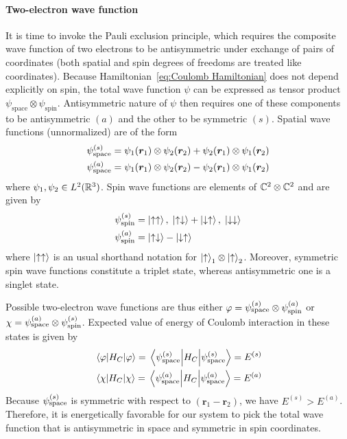 \paragraph{Two-electron wave function}It is time to invoke the Pauli exclusion principle, which requires the composite wave function
of two electrons to be antisymmetric under exchange of pairs of coordinates (both spatial and
spin degrees of freedoms are treated like coordinates). Because 
Hamiltonian~\ref{eq:Coulomb Hamiltonian} does not depend explicitly on spin, the total
wave function \(\psi\) can be expressed as tensor product \(\psi_{\mathrm{space}} 
\otimes \psi_{\mathrm{spin}} \). Antisymmetric nature of \(\psi\) then requires one 
of these components to be antisymmetric \((a)\) and the other to be symmetric \((s)\). 
Spatial wave functions (unnormalized) are of the form
\begin{align}
    &\psi_{\textrm{space}}^{(s)} = \psi_1(\bm{r}_1)\otimes \psi_2(\bm{r}_2) +
    \psi_2(\bm{r}_1)\otimes \psi_1(\bm{r}_2) \\
    &\psi_{\textrm{space}}^{(a)} = \psi_1(\bm{r}_1)\otimes \psi_2(\bm{r}_2) -
    \psi_2(\bm{r}_1)\otimes \psi_1(\bm{r}_2)
\end{align}
where \(\psi_1,\psi_2 \in L^2(\mathbb{R}^3)\). Spin wave functions are elements of \(\mathbb{C}^2 \otimes \mathbb{C}^2\)
and are given by
\begin{align}
    &\psi_{\textrm{spin}}^{(s)} = \ket{\uparrow\uparrow},\; 
    \ket{\uparrow\downarrow} + \ket{\downarrow\uparrow},\; \ket{\downarrow\downarrow} \\
    &\psi_{\textrm{spin}}^{(a)} = \ket{\uparrow\downarrow}-\ket{\downarrow\uparrow}
\end{align}
where \(\ket{\uparrow\uparrow}\) is an usual shorthand notation for \(\ket{\uparrow}_1 \otimes
\ket{\uparrow}_2\). Moreover, symmetric spin wave functions
constitute a triplet state, whereas antisymmetric one is a singlet state. 

Possible two-electron wave functions are thus either \(\varphi=\psi_{\textrm{space}}^{(s)}
\otimes \psi_{\textrm{spin}}^{(a)}\) or \(\chi = \psi_{\textrm{space}}^{(a)}
\otimes \psi_{\textrm{spin}}^{(s)}\). Expected value of energy of Coulomb interaction 
in these states is given by
\begin{align}
    &\expectationvalue{H_C}{\varphi} = \expectationvalue{H_C}{\spas} = E^{(s)}\\
    &\expectationvalue{H_C}{\chi} = \expectationvalue{H_C}{\spaa} = E^{(a)} 
\end{align}
Because \(\psi_{\textrm{space}}^{(s)}\) is symmetric with respect to \((\bm{r}_1-\bm{r}_2)\),
we have \(E^{(s)}>E^{(a)}\). Therefore, it is energetically
favorable for our system to pick the total wave function that is antisymmetric
in space and symmetric in spin coordinates.

